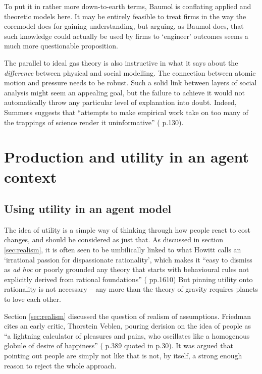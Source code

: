 To put it in rather more down-to-earth terms, Baumol is conflating applied and theoretic models here. It may be entirely feasible to treat firms in the way the \gls{coremodel} does for gaining understanding, but arguing, as Baumol does, that such knowledge could actually be used by firms to `engineer' outcomes seems a much more questionable proposition.

The parallel to ideal gas theory is also instructive in what it says about the \emph{difference} between physical and social modelling. The connection between atomic motion and pressure needs to be robust. Such a solid link between layers of social analysis might seem an appealing goal, but the failure to achieve it would not automatically throw any particular level of explanation into doubt. Indeed, Summers suggests that ``attempts to make empirical work take on too many of the trappings of science render it uninformative'' (\citealt{summers_scientific_1991} p.130).

\section{Production and utility in an agent context \label{sec:produtility_agents}}

\subsection{Using utility in an agent model \label{sec:rationality}}


The idea of utility is a simple way of thinking through how people react to cost changes, and should be considered as just that. As discussed in section \ref{sec:realism}, it is often seen to be umbilically linked to what Howitt calls an `irrational passion for dispassionate rationality', which makes it ``easy to dismiss as \emph{ad hoc} or poorly grounded any theory that starts with behavioural rules not explicitly derived from rational foundations'' (\citealt{ howitt_coordination_2006} pp.1610)  But pinning utility onto rationality is not necessary – any more than the theory of gravity requires planets to love each other. 

Section \ref{sec:realism} discussed the question of realism of assumptions. Friedman cites an early critic, Thorstein Veblen, pouring derision on the idea of people as ``a lightning calculator of pleasures and pains, who oscillates like a homogenous globule of desire of happiness'' (\citealt{veblen_why_1898} p.389 quoted in \citealt{friedman_essays_1953} p.30). It was argued that pointing out people are simply not like that is not, by itself, a strong enough reason to reject the whole approach.

